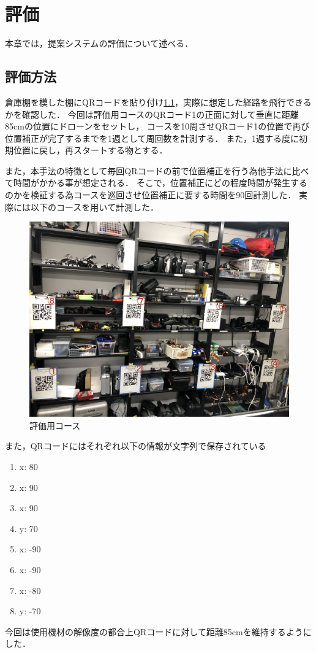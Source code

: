 \chapter{評価}
\label{evaluation}
本章では，提案システムの評価について述べる．

\section{評価方法}
倉庫棚を模した棚にQRコードを貼り付け\ref{course}，実際に想定した経路を飛行できるかを確認した．
今回は評価用コースのQRコード1の正面に対して垂直に距離85cmの位置にドローンをセットし，
コースを10周させQRコード1の位置で再び位置補正が完了するまでを1週として周回数を計測する．
また，1週する度に初期位置に戻し，再スタートする物とする．

また，本手法の特徴として毎回QRコードの前で位置補正を行う為他手法に比べて時間がかかる事が想定される．
そこで，位置補正にどの程度時間が発生するのかを検証する為コースを巡回させ位置補正に要する時間を90回計測した．
実際には以下のコースを用いて計測した．


\begin{figure}[htbp]
  \begin{center}
    \includegraphics[clip,width=15.0cm]{img/course.jpg}
    \caption{評価用コース}
    \label{course}
  \end{center}
\end{figure}

また，QRコードにはそれぞれ以下の情報が文字列で保存されている
\begin{enumerate}
    \item {x: 80}
    \item {x: 90}
    \item {x: 90}
    \item {y: 70}
    \item {x: -90}
    \item {x: -90}
    \item {x: -80}
    \item {y: -70}
\end{enumerate}

今回は使用機材の解像度の都合上QRコードに対して距離85cmを維持するようにした．



